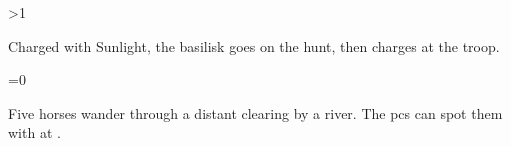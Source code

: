 \ifnum\value{temperature}>1

\basilisk
{}
Charged with Sunlight, the \gls{basilisk} goes on the hunt, then charges at the troop.

\else

\ifnum\value{temperature}=0
\fi

Five horses wander through a distant clearing by a river.
The \glspl{pc} can spot them with  at \tn[10].


\fi
